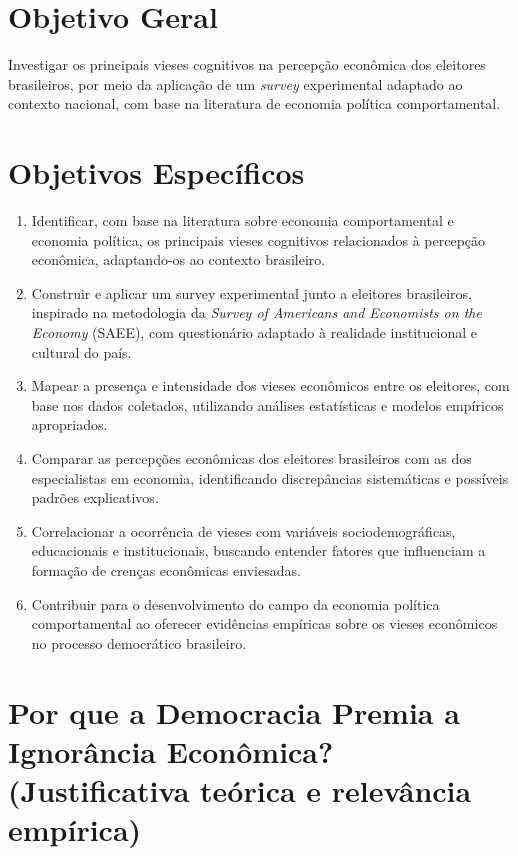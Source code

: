 \section{Objetivo Geral}

Investigar os principais vieses cognitivos na percepção econômica dos eleitores brasileiros, por meio da aplicação de um \textit{survey} experimental adaptado ao contexto nacional, com base na literatura de economia política comportamental.

\section{Objetivos Específicos}

\begin{enumerate}[label=\alph*)]
    \item Identificar, com base na literatura sobre economia comportamental e economia política, os principais vieses cognitivos relacionados à percepção econômica, adaptando-os ao contexto brasileiro.

    \item Construir e aplicar um survey experimental junto a eleitores brasileiros, inspirado na metodologia da \textit{Survey of Americans and Economists on the Economy} (SAEE), com questionário adaptado à realidade institucional e cultural do país.

    \item Mapear a presença e intensidade dos vieses econômicos entre os eleitores, com base nos dados coletados, utilizando análises estatísticas e modelos empíricos apropriados.

    \item Comparar as percepções econômicas dos eleitores brasileiros com as dos especialistas em economia, identificando discrepâncias sistemáticas e possíveis padrões explicativos.

    \item Correlacionar a ocorrência de vieses com variáveis sociodemográficas, educacionais e institucionais, buscando entender fatores que influenciam a formação de crenças econômicas enviesadas.
    
    \item Contribuir para o desenvolvimento do campo da economia política comportamental ao oferecer evidências empíricas sobre os vieses econômicos no processo democrático brasileiro.
\end{enumerate}

\section{Por que a Democracia Premia a Ignorância Econômica?
(Justificativa teórica e relevância empírica)} %

